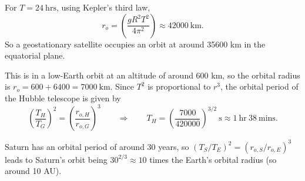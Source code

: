 \documentclass[letter-paper]{tufte-book}
\newenvironment{example}[1][Example]{\begin{trivlist}
\item[\hskip \labelsep {\bfseries #1}]}{\end{trivlist}}
\begin{document}
\begin{example}[Example: Geostationary satellites]
  For $T = 24\ \mathrm{hrs}$, using Kepler's third law,
  \begin{equation*}
    r_o = \left(\frac{g R^2 T^2}{4\pi^2}\right) \approx 42000\ \mathrm{km}.
  \end{equation*}
  So a geostationary satellite occupies an orbit at around 35600 km in the
  equatorial plane.
\end{example}

\begin{example}[Example: Hubble space telescope]
  This is in a low-Earth orbit at an altitude of around 600 km, so the orbital
  radius is $r_o = 600 + 6400 = 7000\ \mathrm{km}$. Since $T^2$ is proportional
  to $r^3$, the orbital period of the Hubble telescope is given by
  \begin{equation*}
    \left(\frac{T_H}{T_G}\right)^2 = \left(\frac{r_{o,H}}{r_{o,G}}\right)^3
    \qquad \Rightarrow \qquad
    T_H = \left(\frac{7000}{420000}\right)^{3/2}\ \mathrm{s} \approx
    1\ \mathrm{hr}\ 38\ \mathrm{mins}.
  \end{equation*}
\end{example}

\begin{example}[Example: Saturn's ``year'' and radius of orbit]
  Saturn has an orbital period of around 30 years, so $(T_S / T_E)^2 = (r_{o,S}
  / r_{o, E})^3$ leads to Saturn's orbit being $30^{2/3} \approx 10$ times the
  Earth's orbital radius (so around 10 AU).
\end{example}
\end{document}
